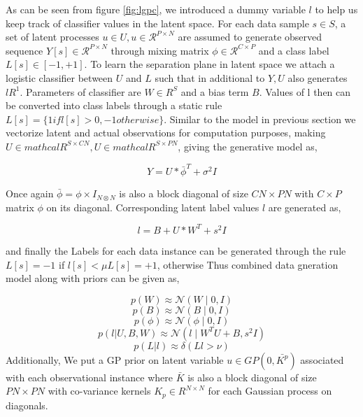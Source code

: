 As can be seen from figure \ref{fig:lgpc}, 
we introduced a dummy variable $l$  to help  us keep track of classifier values in the latent space. For each data sample $s \in S$, a set of latent processes $u \in U , u \in \mathcal{R}^{P \times N} $ are assumed to generate observed sequence $Y[s] \in \mathcal{R}^{P \times N} $  through mixing matrix $\phi \in \mathcal{R}^{C \times P} $ and a class label $L[s] \in [-1,+1]$. To learn the separation plane in latent space we attach a logistic classifier between $U$ and $L$ such that in additional to $Y, U$ also generates $l  R^1$. Parameters  of classifier are  $W \in R^S$ and a bias term $B$. Values of l then can be converted into class labels through a static rule $ L[s] = \{1 if l[s] > 0,  -1 otherwise\}$. Similar to the model in previous section we vectorize latent and actual observations for computation purposes, making $U \in mathcal{R}^ {S \times CN}, U \in mathcal{R}^ {S \times PN}$, giving the generative model as,




\begin{equation}
Y= U * \bar{\phi}^T + \sigma^2I
\end{equation}

Once again ${  \bar{\phi} = \phi \times I_{N \otimes N} }$ is also a block diagonal of size $CN \times PN$ with $C \times P$ matrix ${\phi}$ on its diagonal. Corresponding latent label values $l$ are generated as, 

\begin{equation}
l= B + U * W^T + s^2I
\end{equation}

and finally the Labels for each data instance  can be generated through the rule {$L[s] = -1$ if $l[s] < \mu L[s] = +1$, otherwise}
Thus combined data gneration model along with priors can be given as,

\begin{equation}
p(W) \approx \mathcal{N}(W \mid 0, I)
\end{equation}
\begin{equation}
p(B) \approx \mathcal{N}(B \mid 0, I)
\end{equation}
\begin{equation}
p(\phi) \approx \mathcal{N}(\phi \mid 0, I)
\end{equation}
\begin{equation}
p(l | U, B, W) \approx \mathcal{N}(l \mid W^{T}U + B, s^2I)
\end{equation}
\begin{equation}
p(L | l) \approx \delta(Ll > \nu)
\end{equation}
Additionally, We put a GP prior on latent variable $ u \in GP(0,\bar{K^p})$ associated with each observational instance where $\bar{K}$ is also a block diagonal of size $PN \times PN$ with co-variance kernels ${K_p \in R ^{N \times N}}$ for each  Gaussian process on diagonals.

